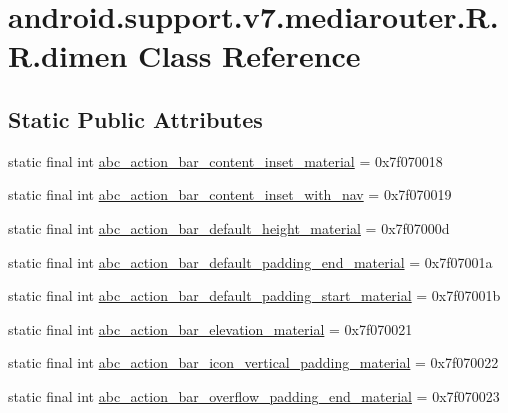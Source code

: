 \hypertarget{classandroid_1_1support_1_1v7_1_1mediarouter_1_1_r_1_1dimen}{
\section{android.support.v7.mediarouter.R.R.dimen Class Reference}
\label{classandroid_1_1support_1_1v7_1_1mediarouter_1_1_r_1_1dimen}
}
\subsection*{Static Public Attributes}
\begin{CompactItemize}
\item 
static final int \hyperlink{classandroid_1_1support_1_1v7_1_1mediarouter_1_1_r_1_1dimen_251920aad862d599319ff1533a278d84}{abc\_\-action\_\-bar\_\-content\_\-inset\_\-material} = 0x7f070018
\item 
static final int \hyperlink{classandroid_1_1support_1_1v7_1_1mediarouter_1_1_r_1_1dimen_14ad5ab27877eb77d6869609008449e8}{abc\_\-action\_\-bar\_\-content\_\-inset\_\-with\_\-nav} = 0x7f070019
\item 
static final int \hyperlink{classandroid_1_1support_1_1v7_1_1mediarouter_1_1_r_1_1dimen_8f54cdd311994b961ba26777918b6b5c}{abc\_\-action\_\-bar\_\-default\_\-height\_\-material} = 0x7f07000d
\item 
static final int \hyperlink{classandroid_1_1support_1_1v7_1_1mediarouter_1_1_r_1_1dimen_c16a78528c538b829e06b5ed87504342}{abc\_\-action\_\-bar\_\-default\_\-padding\_\-end\_\-material} = 0x7f07001a
\item 
static final int \hyperlink{classandroid_1_1support_1_1v7_1_1mediarouter_1_1_r_1_1dimen_f568c2f53be98a1767b70718a10be1dc}{abc\_\-action\_\-bar\_\-default\_\-padding\_\-start\_\-material} = 0x7f07001b
\item 
static final int \hyperlink{classandroid_1_1support_1_1v7_1_1mediarouter_1_1_r_1_1dimen_2e5ab7c06567f6e5095e98b158612844}{abc\_\-action\_\-bar\_\-elevation\_\-material} = 0x7f070021
\item 
static final int \hyperlink{classandroid_1_1support_1_1v7_1_1mediarouter_1_1_r_1_1dimen_f4cf714f70c4d2b1ccc0c5f6a6f18cb0}{abc\_\-action\_\-bar\_\-icon\_\-vertical\_\-padding\_\-material} = 0x7f070022
\item 
static final int \hyperlink{classandroid_1_1support_1_1v7_1_1mediarouter_1_1_r_1_1dimen_7a7fd7c6a95f85137729452a3e300914}{abc\_\-action\_\-bar\_\-overflow\_\-padding\_\-end\_\-material} = 0x7f070023

\end{CompactItemize}
